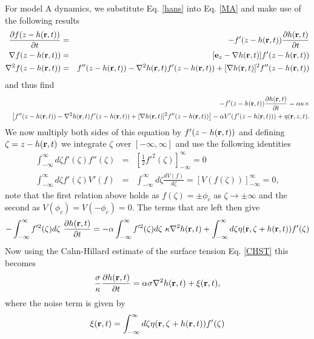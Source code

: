 For model A dynamics, we substitute Eq. \eqref{hans} into Eq. \eqref{MA} and make use of the following results
\begin{eqnarray}
\frac{\partial f(z-h({\bf r},t))}{\partial t}&=& -f'(z-h({\bf r},t))\frac{\partial h({\bf r},t)}{\partial t}\\
\nabla f(z-h({\bf r},t))&=& [{\bf e}_z-\nabla h({\bf r},t)]f'(z-h({\bf r},t))  \\
\nabla^2 f(z-h({\bf r},t))&=& f''(z-h({\bf r},t))- \nabla^2 h({\bf r},t)f'(z-h({\bf r},t))+ [\nabla h({\bf r},t)]^2 
f''(z-h({\bf r},t))
\end{eqnarray}
and thus find
\begin{eqnarray}
&&-f'(z-h({\bf r},t))\frac{\partial h({\bf r},t)}{\partial t}= \alpha\kappa\times\\ &&\left[f''(z-h({\bf r},t))- \nabla^2 h({\bf r},t)f'(z-h({\bf r},t))+ [\nabla h({\bf r},t)]^2 
f''(z-h({\bf r},t))\right] - \alpha V'(f'(z-h({\bf r},t))) + \eta({\bf r},z,t).
\end{eqnarray}
We now multiply both sides of this equation by $f'(z-h({\bf r},t))$ and defining $\zeta=z-h({\bf r},t)$ we integrate  $\zeta$ over $[-\infty,\infty]$ and use the following identities
\begin{eqnarray}
\int_{-\infty}^\infty d\zeta f'(\zeta)f''(\zeta) &=& [\frac{1}{2}f'^2(\zeta)]_{-\infty}^\infty =0\\
\int_{-\infty}^\infty d\zeta f'(\zeta) V'(f) &=& \int_{-\infty}^\infty d\zeta\frac{d V(f)}{d\zeta}= [V(f(\zeta))]_{-\infty}^\infty=0,
\end{eqnarray} 
note that the first relation above holds as $f(\zeta)=\pm \phi_c$ as $\zeta\to\pm \infty$ and the second as
$V(\phi_c)=V(-\phi_c)=0$.
The terms that are left then give
\begin{equation}
-\int_{-\infty}^\infty f'^2(\zeta)d\zeta\ \frac{\partial h({\bf r},t)}{\partial t}
= -\alpha\int_{-\infty}^\infty f'^2(\zeta)d\zeta \ \kappa \nabla^2 h({\bf r},t) + \int_{-\infty}^\infty d\zeta \eta({\bf r},\zeta+ h({\bf r},t))f'(\zeta)
\end{equation}
Now using the Cahn-Hillard estimate of the surface tension Eq. \eqref{CHST} this becomes
\begin{equation}
\frac{\sigma}{\kappa} \frac{\partial h({\bf r},t)}{\partial t}
= \alpha\sigma \nabla^2 h({\bf r},t) +\xi({\bf r},t),
\end{equation}
where the noise term is given by
\begin{equation}
\xi({\bf r},t)= \int_{-\infty}^\infty d\zeta \eta({\bf r},\zeta+ h({\bf r},t))f'(\zeta)
\end{equation}
